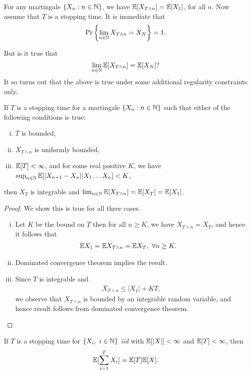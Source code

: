 \documentclass[a4paper,10pt,english]{article}
\begin{document}
\begin{rem}
For any martingale $\{X_n: n \in \mathbb{N}\}$, we have $\mathbb{E}[X_{T\wedge n}]=\mathbb{E}[X_1]$, for all $n$.  Now assume that $T$ is a stopping time. It is immediate that 
\begin{equation*}
\Pr\left\{\lim_{n\in \mathbb{N}}{X}_{T\wedge n} = X_N\right\} = 1.
\end{equation*}
\end{rem}
But  is it true that
\begin{equation*}
\lim_{n \in \mathbb{N}}\mathbb{E}[X_{T\wedge n}] = \mathbb{E}[X_N]?
\end{equation*}
It so turns out that the above is true under some additional regularity constraints only. %
\begin{thm}
\label{MartStopThm}
If $T$ is a stopping time for a martingale $\{X_n: n \in \mathbb{N}\}$ such that either of the following conditions is true:
\begin{enumerate}[(i)]
\item $T$ is bounded, 
\item $X_{T\wedge n}$ is uniformly bounded,
\item $\mathbb{E}[T] < \infty$, and for some real positive $K$, we have $\sup_{n \in \mathbb{N}}\mathbb{E}[|X_{n+1}-X_n||X_1 \hdots X_n] < K$,
\end{enumerate}
then $X_T$ is integrable and $\lim_{n \in \mathbb{N}}\mathbb{E}[X_{T\wedge n}] = \mathbb{E}[X_T]=\mathbb{E}[X_1]$.
\end{thm}
\begin{proof} We show this is true for all three cases.
\begin{enumerate}[(i)] 
\item Let $K$ be the bound on $T$ then for all $n \geq K$, we have $X_{T\wedge n} = X_T$, and hence it follows that
\begin{align*}
\mathbb{E} X_1 = \mathbb{E} X_{T\wedge n} &= \mathbb{E} X_T, ~\forall n \geq K.
\end{align*}
\item Dominated convergence theorem implies the result. 
\item Since $T$ is integrable and  
\begin{align*} 
X_{T\wedge n} \leq |X_1| + K T,
\end{align*}
we observe that $X_{T\wedge n}$ is bounded by an integrable random variable, and hence result follows from dominated convergence theorem.
\end{enumerate}
\end{proof}
\begin{cor} If $T$ is a stopping time for $\{X_i,~ i \in \mathbb{N}\}$ \textit{iid} with $\mathbb{E}[|X|]< \infty$ and $\mathbb{E}[T]< \infty$, then
\begin{align*}
\mathbb{E}[\sum_{i=1}^{T}X_i]=\mathbb{E}[T]\mathbb{E}[X].
\end{align*}
\end{cor}
\end{document}
